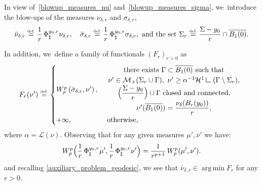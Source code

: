 \documentclass[JEP,XML,SOM,Unicode,NoFloatCountersInSection,published]{cedram}
\theoremstyle{definition}
\newcommand{\eqdef}{\ensuremath{\stackrel{\mbox{\upshape\tiny def.}}{=}}}
\newcommand\LM[1]{\hbox{\vrule width.5pt \vbox to#1pt{\vfill \hrule width#1pt height.5pt}}}
\newcommand\LL{{\mathchoice {\>\LM7\>}{\>\LM7\>}{\,\LM5\,}{\,\LM{3.35}\,}}}
\newcommand{\mres}{\LL}
\newcommand\cH{\mathcal{H}}
\DeclareMathOperator*{\argmin}{arg\,min}
\begin{document}
In view of~\eqref{blowup_measures_nu} and~\eqref{blowup_measures_sigma}, we~introduce the blow-ups of the measures $\nu_{\delta ,r}$ and $\sigma_{\delta , r}$,
\begin{equation}\label{blowup_measures_renormalized}
\bar\nu_{\delta ,r}
\eqdef
\frac{1}{r}\,
\Phi^{y_0,r}_{\sharp}
\nu_{\delta ,r},
\quad
\bar\sigma_{\delta ,r}
\eqdef
\frac{1}{r}\,\Phi^{y_0,r}_{\sharp}
\sigma_{\delta , r},
\text{ and the set }
\Sigma_r \eqdef
\frac{\Sigma - y_0}{r}\cap \overline{B_1(0)}.
\end{equation}

In addition, we~define a family of functionals ${\left(F_r\right)}_{r > 0}$ as
\begin{equation}\label{family_Fr}
F_r(\nu') \eqdef
\begin{cases}
W_p^p\left(
\bar \sigma_{\delta ,r},
\nu'
\right),&
\begin{array}{c}
\text{there exists $\Gamma \subset \overline{B_1(0)}$ such that}\\
\nu' \in \mathcal{M}_+(\Sigma_r \cup \Gamma), \
\nu' \ge \alpha^{-1}\cH^1\mres(\Gamma\setminus \Sigma_r),\\
\Bigl(\dfrac{\Sigma-y_0}{r}\Bigr) \cup \Gamma \text{ closed and connected}, \\
\nu'(\overline{B_1(0)}) = \dfrac{\nu_\delta(B_r(y_0))}{r},
\end{array} \\
+\infty,& \text{ otherwise,}
\end{cases}
\end{equation}
where $\alpha = \mathcal{L}(\nu)$.
Observing that for any given measures $\mu', \nu'$ we have:
\begin{equation}\label{blowup_Wasserstein_identity}
W_p^p
\Bigl(
\frac{1}{r}\,\Phi^{y_0, r}_\sharp \mu',
\frac{1}{r}\,\Phi^{y_0, r}_\sharp \nu'
\Bigr)
=
\frac{1}{r^{p+1}}\,
W_p^p( \mu', \nu').
\end{equation}
and recalling
\eqref{auxiliary_problem_geodesic},
we see that $\bar \nu_{\delta ,r} \in \argmin F_r$ for any $r>0$.
\end{document}

